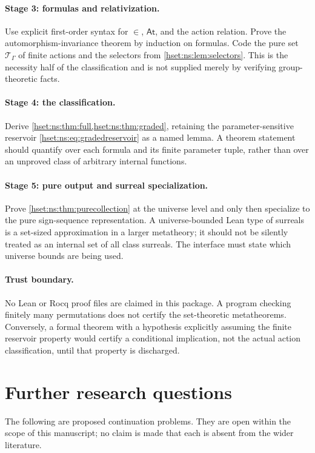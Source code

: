 \documentclass[11pt,letterpaper]{article}
\theoremstyle{definition}
\theoremstyle{remark}
\newcommand{\At}{\mathsf{At}}
\newcommand{\calT}{\mathcal T_{\Gamma}}
\begin{document}
\paragraph{Stage 3: formulas and relativization.}
Use explicit first-order syntax for $\in$, $\At$, and the action relation. Prove the automorphism-invariance theorem by induction on formulas. Code the pure set $\calT$ of finite actions and the selectors from \cref{hset:ns:lem:selectors}. This is the necessity half of the classification and is not supplied merely by verifying group-theoretic facts.

\paragraph{Stage 4: the classification.}
Derive \cref{hset:ns:thm:full,hset:ns:thm:graded}, retaining the parameter-sensitive reservoir \eqref{hset:ns:eq:gradedreservoir} as a named lemma. A theorem statement should quantify over each formula and its finite parameter tuple, rather than over an unproved class of arbitrary internal functions.

\paragraph{Stage 5: pure output and surreal specialization.}
Prove \cref{hset:ns:thm:purecollection} at the universe level and only then specialize to the pure sign-sequence representation. A universe-bounded Lean type of surreals is a set-sized approximation in a larger metatheory; it should not be silently treated as an internal set of all class surreals. The interface must state which universe bounds are being used.

\paragraph{Trust boundary.}
No Lean or Rocq proof files are claimed in this package. A program checking finitely many permutations does not certify the set-theoretic metatheorems. Conversely, a formal theorem with a hypothesis explicitly assuming the finite reservoir property would certify a conditional implication, not the actual action classification, until that property is discharged.

\section{Further research questions}
\label{hset:ns:sec:questions}
The following are proposed continuation problems. They are open within the scope of this manuscript; no claim is made that each is absent from the wider literature.
\end{document}
